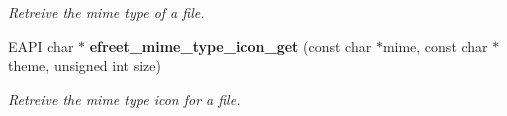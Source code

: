\begin{CompactItemize}
\begin{CompactList}\small\item\em Retreive the mime type of a file. \item\end{CompactList}\item 
EAPI char $\ast$ {\bf efreet\_\-mime\_\-type\_\-icon\_\-get} (const char $\ast$mime, const char $\ast$theme, unsigned int size)
\begin{CompactList}\small\item\em Retreive the mime type icon for a file. \item\end{CompactList}\end{CompactItemize}
